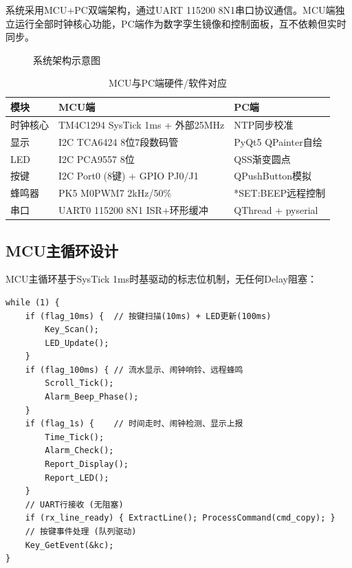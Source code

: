 \documentclass[12pt,hyperref,a4paper,UTF8]{ctexart}
\begin{document}
系统采用MCU+PC双端架构，通过UART 115200 8N1串口协议通信。MCU端独立运行全部时钟核心功能，PC端作为数字孪生镜像和控制面板，互不依赖但实时同步。

\begin{figure}[!htbp]
    \centering
    \caption{系统架构示意图}
    \label{fig:arch}
\end{figure}

\begin{table}[!htbp]
    \centering
    \begin{tabular}{l|l|l}
    \hline
    \textbf{模块} & \textbf{MCU端} & \textbf{PC端} \\
    \hline
    时钟核心 & TM4C1294 SysTick 1ms + 外部25MHz & NTP同步校准 \\
    显示 & I2C TCA6424 8位7段数码管 & PyQt5 QPainter自绘 \\
    LED & I2C PCA9557 8位 & QSS渐变圆点 \\
    按键 & I2C Port0 (8键) + GPIO PJ0/J1 & QPushButton模拟 \\
    蜂鸣器 & PK5 M0PWM7 2kHz/50\% & *SET:BEEP远程控制 \\
    串口 & UART0 115200 8N1 ISR+环形缓冲 & QThread + pyserial \\
    \hline
    \end{tabular}
    \caption{MCU与PC端硬件/软件对应}
\end{table}

\subsection{MCU主循环设计}

MCU主循环基于SysTick 1ms时基驱动的标志位机制，无任何Delay阻塞：

\begin{verbatim}
while (1) {
    if (flag_10ms) {  // 按键扫描(10ms) + LED更新(100ms)
        Key_Scan();
        LED_Update();
    }
    if (flag_100ms) { // 流水显示、闹钟响铃、远程蜂鸣
        Scroll_Tick();
        Alarm_Beep_Phase();
    }
    if (flag_1s) {    // 时间走时、闹钟检测、显示上报
        Time_Tick();
        Alarm_Check();
        Report_Display();
        Report_LED();
    }
    // UART行接收 (无阻塞)
    if (rx_line_ready) { ExtractLine(); ProcessCommand(cmd_copy); }
    // 按键事件处理 (队列驱动)
    Key_GetEvent(&kc);
}
\end{verbatim}
\end{document}
